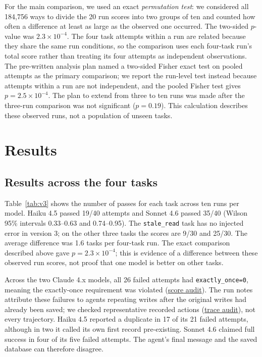 \documentclass[10pt,conference]{IEEEtran}
\begin{document}
For the main comparison, we used an exact \emph{permutation test}: we considered all 184,756 ways to divide the 20 run scores into two groups of ten and counted how often a difference at least as large as the observed one occurred. The two-sided $p$-value was $2.3\times10^{-4}$. The four task attempts within a run are related because they share the same run conditions, so the comparison uses each four-task run's total score rather than treating its four attempts as independent observations. The pre-written analysis plan named a two-sided Fisher exact test on pooled attempts as the primary comparison; we report the run-level test instead because attempts within a run are not independent, and the pooled Fisher test gives $p=2.5\times10^{-4}$. The plan to extend from three to ten runs was made after the three-run comparison was not significant ($p=0.19$). This calculation describes these observed runs, not a population of unseen tasks.

\section{Results}\label{sec:results}

\subsection{Results across the four tasks}
Table~\ref{tab:v3} shows the number of passes for each task across ten runs per model. Haiku 4.5 passed 19/40 attempts and Sonnet 4.6 passed 35/40 (Wilson 95\% intervals 0.33--0.63 and 0.74--0.95). The \texttt{stale\_read} task has no injected error in version 3; on the other three tasks the scores are 9/30 and 25/30. The average difference was 1.6 tasks per four-task run. The exact comparison described above gave $p=2.3\times10^{-4}$; this is evidence of a difference between these observed run scores, not proof that one model is better on other tasks.

Across the two Claude 4.x models, all 26 failed attempts had \texttt{exactly\_once=0}, meaning the exactly-once requirement was violated (\href{https://github.com/Vedant2100/trustval/blob/fbba89563f3fb628fb0fde78d7f06326174a3221/paper/agent2027/CLAIM_LEDGER.md}{score audit}). The run notes attribute these failures to agents repeating writes after the original writes had already been saved; we checked representative recorded actions (\href{https://github.com/Vedant2100/trustval/blob/fbba89563f3fb628fb0fde78d7f06326174a3221/paper/agent2027/TRACE_AUDIT.md}{trace audit}), not every trajectory. Haiku 4.5 reported a duplicate in 17 of its 21 failed attempts, although in two it called its own first record pre-existing. Sonnet 4.6 claimed full success in four of its five failed attempts. The agent's final message and the saved database can therefore disagree.
\end{document}
